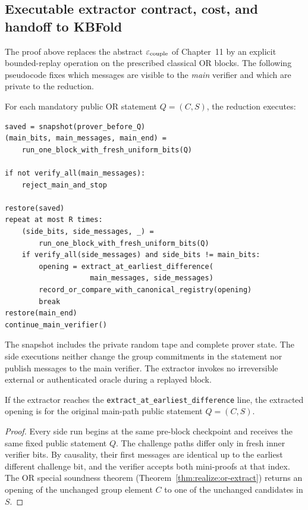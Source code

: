 \subsection{Executable extractor contract, cost, and handoff to KBFold}\label{sec:global:handoff}
The proof above replaces the abstract
$\varepsilon_{\rm couple}$ of Chapter~11
by an explicit bounded-replay operation
on the prescribed classical OR blocks.
The following pseudocode fixes which
messages are visible to the \emph{main}
verifier and which are private to the
reduction.

\begin{definition}\label{def:global:pseudocode}
For each mandatory public OR statement
$Q=(C,S)$, the reduction executes:
\begin{verbatim}
saved = snapshot(prover_before_Q)
(main_bits, main_messages, main_end) =
    run_one_block_with_fresh_uniform_bits(Q)

if not verify_all(main_messages):
    reject_main_and_stop

restore(saved)
repeat at most R times:
    (side_bits, side_messages, _) =
        run_one_block_with_fresh_uniform_bits(Q)
    if verify_all(side_messages) and side_bits != main_bits:
        opening = extract_at_earliest_difference(
                    main_messages, side_messages)
        record_or_compare_with_canonical_registry(opening)
        break
restore(main_end)
continue_main_verifier()
\end{verbatim}
The snapshot includes the private
random tape and complete prover
state. The side executions neither
change the group commitments in the
statement nor publish messages to
the main verifier. The extractor
invokes no irreversible external
or authenticated oracle during
a replayed block.
\end{definition}

\begin{lemma}\label{lem:global:tag-same}
If the extractor reaches the
\texttt{extract\_at\_earliest\_difference}
line, the extracted opening is for
the original main-path public
statement $Q=(C,S)$.
\end{lemma}
\begin{proof}
Every side run begins at the same
pre-block checkpoint and receives
the same fixed public statement $Q$.
The challenge paths differ only in
fresh inner verifier bits.
By causality, their first messages
are identical up to the earliest
different challenge bit, and the
verifier accepts both mini-proofs
at that index. The OR special
soundness theorem
(Theorem~\ref{thm:realize:or-extract})
returns an opening of the
unchanged group element $C$
to one of the unchanged
candidates in $S$.
\end{proof}

